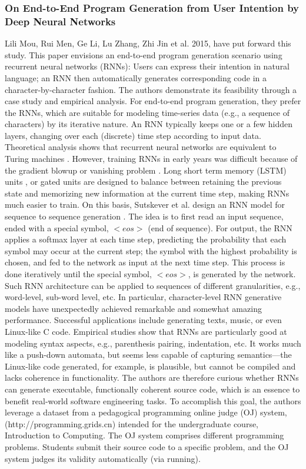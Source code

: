 \documentclass[conference, onecolumn, a4, 12pt]{IEEEtran}
\begin{document}
\subsubsection{On End-to-End Program Generation from User Intention by Deep Neural Networks}
Lili Mou, Rui Men, Ge Li, Lu Zhang, Zhi Jin et al. 2015, have put forward this study. This paper envisions an end-to-end program generation scenario
using recurrent neural networks (RNNs): Users can express their intention in natural language; an RNN then automatically generates corresponding code in a character-by-character fashion. The authors demonstrate its feasibility through a case study and empirical analysis. For end-to-end program generation, they prefer the RNNs, which are suitable for modeling time-series data (e.g., a sequence of characters) by its iterative nature. An RNN typically keeps one or a few hidden layers, changing over each (discrete) time step according to input data.\newline
Theoretical analysis shows that recurrent neural networks are equivalent to Turing machines \cite{a6}. However, training RNNs in early years was difficult because of the gradient blowup or vanishing problem \cite{a7}. Long short term memory
(LSTM) units \cite{a8}, or gated units \cite{a9} are designed to balance
between retaining the previous state and memorizing new information at the current time step, making RNNs much easier to train.\newline
On this basis, Sutskever et al. design an RNN model for sequence to sequence generation \cite{a10}. The idea is to first read an input sequence, ended with a special symbol, $<eos>$ (end of sequence). For output, the RNN applies a softmax layer at each time step, predicting the probability that each symbol may occur at the current step; the symbol with the highest probability is chosen, and fed to the network as input at the next time step. This process is done iteratively until the special symbol, $<eos>$, is generated by the network.\newline
Such RNN architecture can be applied to sequences of different granularities, e.g., word-level, sub-word level, etc. In particular, character-level RNN generative models have unexpectedly achieved remarkable and somewhat amazing performance. Successful applications include generating texts, music, or even Linux-like C code. \cite{a11} Empirical studies show that RNNs are particularly good at modeling syntax aspects, e.g., parenthesis pairing, indentation, etc. \cite{a12} It works much like a push-down automata, but seems less capable of capturing semantics—the Linux-like code generated, for example, is plausible, but cannot be compiled and lacks coherence in functionality.
The authors are therefore curious whether RNNs can generate executable, functionally coherent source code, which is an essence to benefit real-world software engineering tasks.
To accomplish this goal, the authors leverage a dataset from a pedagogical
programming online judge (OJ) system,(http://programming.grids.cn) intended for the undergraduate course, Introduction to Computing. The OJ system comprises different programming problems. Students submit their source code to a specific problem, and the OJ system judges its validity automatically (via running).
\end{document}

